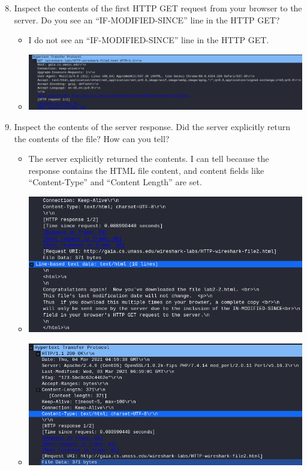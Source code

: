 \documentclass[11pt]{article}
\begin{document}
\begin{enumerate}
  \setcounter{enumi}{7}
\item Inspect the contents of the first HTTP GET request from your browser to
  the server.  Do you see an ``IF-MODIFIED-SINCE'' line in the HTTP GET?
  \begin{itemize}
  \item I do not see an ``IF-MODIFIED-SINCE'' line in the HTTP GET.\
  \item \includegraphics[width=\textwidth]{img/ws-if-modified-since-1}
  \end{itemize}
\item Inspect the contents of the server response. Did the server explicitly
  return the contents of the file?  How can you tell?
  \begin{itemize}
  \item The server explicitly returned the contents.  I can tell because the
    response contains the HTML file content, and content fields like
    ``Content-Type'' and ``Content Length'' are set.
  \item \includegraphics[width=\textwidth]{img/ws-html-contents}
  \item \includegraphics[width=\textwidth]{img/ws-html-content-type}

\end{itemize}
\end{enumerate}
\end{document}
